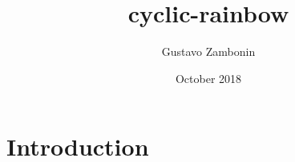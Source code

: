 \documentclass[12pt]{article}
\title{cyclic-rainbow}
\author{Gustavo Zambonin}
\date{October 2018}
\begin{document}
\maketitle

\section{Introduction}
\end{document}

